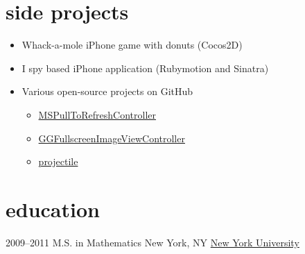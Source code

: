 \documentclass[]{friggeri-cv} %
\begin{document}

\section{side projects}

\begin{itemize}
\item Whack-a-mole iPhone game with donuts (Cocos2D)
\item I spy based iPhone application (Rubymotion and Sinatra)
\item Various open-source projects on GitHub
\begin{itemize}
\item \href{https://github.com/bogardon/MSPullToRefreshController}{MSPullToRefreshController}
\item \href{https://github.com/bogardon/GGFullscreenImageViewController}{GGFullscreenImageViewController}
\item \href{https://github.com/bogardon/projectile}{projectile}
\end{itemize}
\end{itemize}


\section{education}

\begin{entrylist}
\entry
{2009--2011}
{M.S. {\normalfont in Mathematics}}
{New York, NY}
{\href{http://www.math.nyu.edu/}{New York University}}
\end{entrylist}
\end{document}
